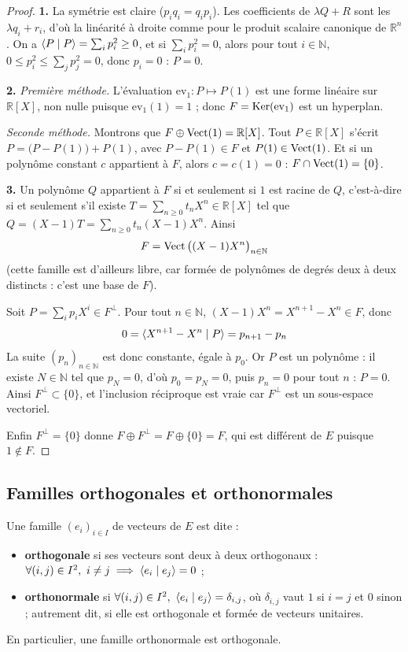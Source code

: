 \begin{proof}
\textbf{1.} La symétrie est claire ($p_iq_i=q_ip_i$). Les coefficients de $\lambda Q+R$ sont les $\lambda q_i+r_i$, d'où la linéarité à droite comme pour le produit scalaire canonique de $\mathbb{R}^n$. On a $\langle P\mid P\rangle=\sum_ip_i^2\geq 0$, et si $\sum_ip_i^2=0$, alors pour tout $i\in\mathbb{N}$, $0\leq p_i^2\leq\sum_jp_j^2=0$, donc $p_i=0$ : $P=0$.

\textbf{2.} \emph{Première méthode.} L'évaluation $\mathrm{ev}_1:P\mapsto P(1)$ est une forme linéaire sur $\mathbb{R}[X]$, non nulle puisque $\mathrm{ev}_1(1)=1$ ; donc $F=\operatorname{Ker}(\mathrm{ev}_1)$ est un hyperplan.

\emph{Seconde méthode.} Montrons que $F\oplus\operatorname{Vect}(1)=\mathbb{R}[X]$. Tout $P\in\mathbb{R}[X]$ s'écrit $P=\big(P-P(1)\big)+P(1)$, avec $P-P(1)\in F$ et $P(1)\in\operatorname{Vect}(1)$. Et si un polynôme constant $c$ appartient à $F$, alors $c=c(1)=0$ : $F\cap\operatorname{Vect}(1)=\{0\}$.

\textbf{3.} Un polynôme $Q$ appartient à $F$ si et seulement si $1$ est racine de $Q$, c'est-à-dire si et seulement s'il existe $T=\sum_{n\geq 0}t_nX^n\in\mathbb{R}[X]$ tel que $Q=(X-1)T=\sum_{n\geq 0}t_n(X-1)X^n$. Ainsi
\[F=\operatorname{Vect}\big((X-1)X^n\big)_{n\in\mathbb{N}}\]
(cette famille est d'ailleurs libre, car formée de polynômes de degrés deux à deux distincts : c'est une base de $F$).

Soit $P=\sum_ip_iX^i\in F^\perp$. Pour tout $n\in\mathbb{N}$, $(X-1)X^n=X^{n+1}-X^n\in F$, donc
\[0=\langle X^{n+1}-X^n\mid P\rangle=p_{n+1}-p_n\]
La suite $(p_n)_{n\in\mathbb{N}}$ est donc constante, égale à $p_0$. Or $P$ est un polynôme : il existe $N\in\mathbb{N}$ tel que $p_N=0$, d'où $p_0=p_N=0$, puis $p_n=0$ pour tout $n$ : $P=0$. Ainsi $F^\perp\subset\{0\}$, et l'inclusion réciproque est vraie car $F^\perp$ est un sous-espace vectoriel.

Enfin $F^\perp=\{0\}$ donne $F\oplus F^\perp=F\oplus\{0\}=F$, qui est différent de $E$ puisque $1\notin F$.
\end{proof}

\subsection{Familles orthogonales et orthonormales}

\begin{defi}
\label{defi:famille-orthonormale}
Une famille $(e_i)_{i\in I}$ de vecteurs de $E$ est dite :
\begin{itemize}
\item \textbf{orthogonale} si ses vecteurs sont deux à deux orthogonaux : $\forall(i,j)\in I^2,\ i\neq j\implies\langle e_i\mid e_j\rangle=0$ ;
\item \textbf{orthonormale} si $\forall(i,j)\in I^2,\ \ps{e_i}{e_j}=\delta_{i,j}$, où $\delta_{i,j}$ vaut $1$ si $i=j$ et $0$ sinon ; autrement dit, si elle est orthogonale et formée de vecteurs unitaires.
\end{itemize}
En particulier, une famille orthonormale est orthogonale.
\end{defi}

